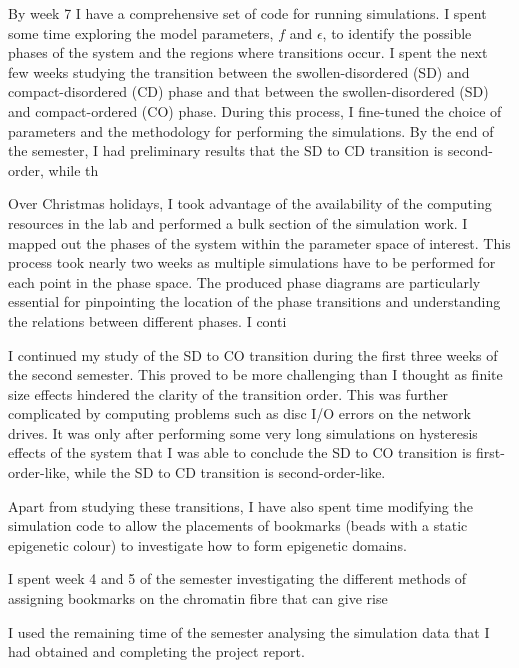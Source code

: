 \documentclass[12pt]{article}
\begin{document}
By week 7 I have a comprehensive set of code for running simulations. I spent some time exploring the model parameters, $f$ and $\epsilon$, to identify the possible phases of the system and the regions where transitions occur. I spent the next few weeks studying the transition between the swollen-disordered (SD) and compact-disordered (CD) phase and that between the swollen-disordered (SD) and compact-ordered (CO) phase. During this process, I fine-tuned the choice of parameters and the methodology for performing the simulations. By the end of the semester, I had preliminary results that the SD to CD transition is second-order, while th

Over Christmas holidays, I took advantage of the availability of the computing resources in the lab and performed a bulk section of the simulation work. I mapped out the phases of the system within the parameter space of interest. This process took nearly two weeks as multiple simulations have to be performed for each point in the phase space. The produced phase diagrams are particularly essential for pinpointing the location of the phase transitions and understanding the relations between different phases. I conti

I continued my study of the SD to CO transition during the first three weeks of the second semester.  This proved to be more challenging than I thought as finite size effects hindered the clarity of the transition order. This was further complicated by computing problems such as disc I/O errors on the network drives. It was only after performing some very long simulations on hysteresis effects of the system that I was able to conclude the SD to CO transition is first-order-like, while the SD to CD transition is second-order-like.

Apart from studying these transitions, I have also spent time modifying the simulation code to allow the placements of bookmarks (beads with a static epigenetic colour) to investigate how to form epigenetic domains. 

I spent week 4 and 5 of the semester investigating the different methods of assigning bookmarks on the chromatin fibre that can give rise 

I used the remaining time of the semester analysing the simulation data that I had obtained and completing the project report.


\maintext
\end{document}
